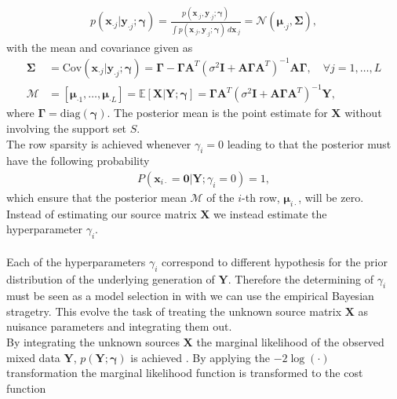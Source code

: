 \begin{align*}
p(\mathbf{x}_{\cdot j} \vert \mathbf{y}_{\cdot j} ; \boldsymbol{\gamma}) = \frac{p(\mathbf{x}_{\cdot j}, \mathbf{y}_{\cdot j} ; \boldsymbol{\gamma})}{\int p(\mathbf{x}_{\cdot j}, \mathbf{y}_{\cdot j} ; \boldsymbol{\gamma}) \ d \mathbf{x}_{\cdot j}} = \mathcal{N}(\boldsymbol{\mu}_{\cdot j}, \boldsymbol{\Sigma}),
\end{align*}
with the mean and covariance given as
\begin{align}\label{eq:moments}
\boldsymbol{\Sigma} &= \text{Cov}(\mathbf{x}_{\cdot j} \vert \mathbf{y}_{\cdot j} ; \boldsymbol{\gamma}) = \boldsymbol{\Gamma} - \boldsymbol{\Gamma} \mathbf{A}^T \left( \sigma^2 \mathbf{I} + \mathbf{A} \boldsymbol{\Gamma} \mathbf{A}^T\right)^{-1} \mathbf{A} \boldsymbol{\Gamma}, \quad \forall j = 1, \dots, L \\
\mathcal{M} &= [\boldsymbol{\mu}_{\cdot 1}, \dots, \boldsymbol{\mu}_{\cdot L}] = \mathbb{E}[\mathbf{X} \vert \mathbf{Y} ; \boldsymbol{\gamma}] = \boldsymbol{\Gamma} \mathbf{A}^T \left( \sigma^2 \mathbf{I} + \mathbf{A} \boldsymbol{\Gamma} \mathbf{A}^T\right)^{-1} \mathbf{Y},
\end{align}
where $\boldsymbol{\Gamma} = \text{diag}(\boldsymbol{\gamma})$. The posterior mean is the point estimate for $\mathbf{X}$ without involving the support set $S$.
\\
The row sparsity is achieved whenever $\gamma_i = 0$ leading to that the posterior must have the following probability
\begin{align*}
P(\mathbf{x}_{i \cdot} = \mathbf{0} \vert \mathbf{Y} ; \gamma_i = 0) = 1,
\end{align*}
which ensure that the posterior mean $\mathcal{M}$ of the $i$-th row, $\boldsymbol{\mu}_{i \cdot}$, will be zero. Instead of estimating our source matrix $\mathbf{X}$ we instead estimate the hyperparameter $\gamma_i$.
\\ \\
Each of the hyperparameters $\gamma_i$ correspond to different hypothesis for the prior distribution of the underlying generation of $\mathbf{Y}$. Therefore the determining of $\gamma_i$ must be seen as a model selection in with we can use the empirical Bayesian stragetry. This evolve the task of treating the unknown source matrix $\mathbf{X}$ as nuisance parameters and integrating them out.
\\
By integrating the unknown sources $\mathbf{X}$ the marginal likelihood of the observed mixed data $\mathbf{Y}$, $p (\mathbf{Y} ; \boldsymbol{\gamma})$ is achieved \cite[p. 146]{phd_wipf}. By applying the $-2 \log (\cdot)$ transformation the marginal likelihood function is transformed to the cost function
